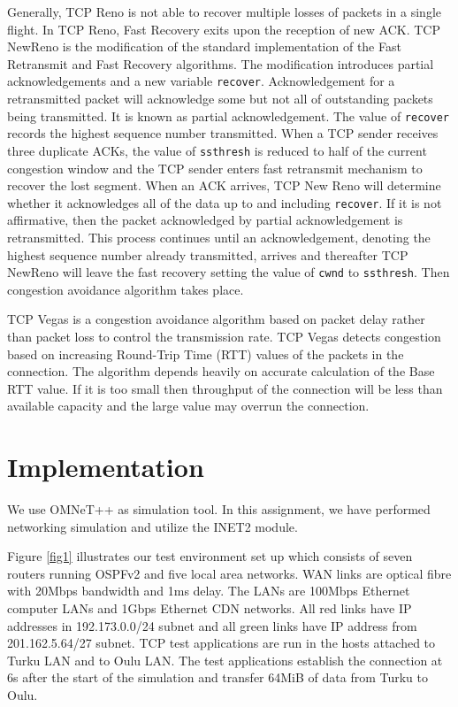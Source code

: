 \documentclass[conference,a4paper]{IEEEtran}
\begin{document}
Generally, TCP Reno \cite{tcpreno} is not able to recover multiple losses of packets in a single flight. In TCP Reno, Fast Recovery exits upon the reception of new ACK. TCP NewReno is the modification of the standard implementation of the Fast Retransmit and Fast Recovery algorithms. The modification introduces partial acknowledgements and a new variable \texttt{recover}. Acknowledgement for a retransmitted packet will acknowledge some but not all of outstanding packets being transmitted. It is known as partial acknowledgement. The value of \texttt{recover} records the highest sequence number transmitted. When a TCP sender receives three duplicate ACKs, the value of \texttt{ssthresh} is reduced to half of the current congestion window and the TCP sender enters fast retransmit mechanism to recover the lost segment. When an ACK arrives, TCP New Reno will determine whether it acknowledges all of the data up to and including \texttt{recover}. If it is not affirmative, then the packet acknowledged by partial acknowledgement is retransmitted. This process continues until an acknowledgement, denoting the highest sequence number already transmitted, arrives and thereafter TCP NewReno \cite{tcpnewreno} will leave the fast recovery setting the value of \texttt{cwnd} to \texttt{ssthresh}. Then congestion avoidance algorithm takes place.


TCP Vegas \cite{brakmo1995tcp} is a congestion avoidance algorithm based on packet delay rather than packet loss to control the transmission rate. TCP Vegas detects congestion based on increasing Round-Trip Time (RTT) values of the packets in the connection. The algorithm depends heavily on accurate calculation of the Base RTT value. If it is too small then throughput of the connection will be less than available capacity and the large value may overrun the connection.

\section{Implementation}
We use OMNeT++ as simulation tool. In this assignment, we have performed networking simulation and utilize the INET2 module.

Figure \ref{fig1} illustrates our test environment set up which consists of seven routers running OSPFv2 and five local area networks.
WAN links are optical fibre with 20Mbps bandwidth and 1ms delay.
The LANs are 100Mbps Ethernet computer LANs and 1Gbps Ethernet CDN networks.
All red links have IP addresses in 192.173.0.0/24 subnet and all green links have IP address from 201.162.5.64/27 subnet.
TCP test applications are run in the hosts attached to Turku LAN and to Oulu LAN.
The test applications establish the connection at 6s after the start of the simulation and transfer 64MiB of data from Turku to Oulu. 
\end{document}
